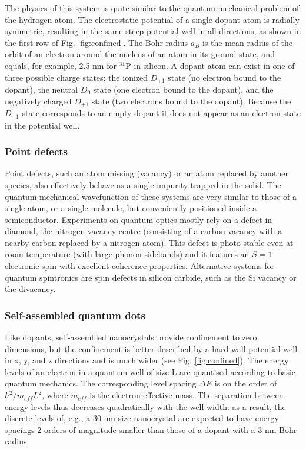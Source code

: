 \documentclass[a4paper,11pt]{article}
\begin{document}
The physics of this system is quite similar to the quantum mechanical problem of the hydrogen atom. The electrostatic potential of a single-dopant atom is radially symmetric, resulting in the same steep potential well in all directions, as shown in the first row of Fig. \ref{fig:confined}. The Bohr radius $a_B$ is the mean radius of the orbit of an
electron around the nucleus of an atom in its ground state, and equals, for example, 2.5 nm for $^{31}$P in silicon. A dopant atom can exist in one of three possible charge states: the ionized $D_{+1}$ state (no electron bound to the dopant), the neutral $D_0$ state (one electron bound to the dopant), and the negatively charged $D_{+1}$ state (two electrons bound to the dopant). Because the $D_{+1}$ state corresponds to an empty dopant it does not appear as an electron state in the potential well. 

\subsubsection{Point defects}
Point defects, such an atom missing (vacancy) or an atom replaced by another species, also effectively behave as a single impurity trapped in the solid. The quantum mechanical wavefunction of these systems are very similar to those of a single atom, or a single molecule, but conveniently positioned inside a semiconductor. Experiments on quantum optics mostly rely on a defect in diamond, the nitrogen vacancy centre (consisting of a carbon vacancy with a nearby carbon replaced by a nitrogen atom). This defect is photo-stable even at room temperature (with large phonon sidebands) and it features an $S=1$ electronic spin with excellent coherence properties. Alternative systems for quantum spintronics are spin defects in silicon carbide, such as the Si vacancy or the divacancy.
 
\subsubsection {Self-assembled quantum dots}
Like dopants, self-assembled nanocrystals provide confinement to zero dimensions, but the confinement
is better described by a hard-wall potential well in x, y, and z directions and is much wider (see Fig. \ref{fig:confined}). The energy levels of an electron in a quantum well of size L are quantised according to basic quantum mechanics. The corresponding level spacing $\Delta E$ is on the order of $h^2/m_{eff}L^2$, where $m_{eff}$ is the electron effective mass. The separation between energy levels thus decreases quadratically with the well width: as a result, the discrete levels of, e.g., a
30 nm size nanocrystal are expected to have energy spacings 2 orders of magnitude smaller than those of a dopant with a 3 nm Bohr radius.
\end{document}
